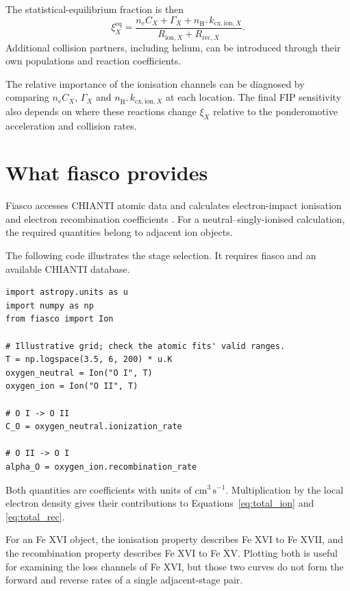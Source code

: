 \documentclass[a4paper,10pt,twoside,openany]{book}
\numberwithin{equation}{chapter}
\newenvironment{example}[1]{%
  \begin{tcolorbox}[bookbox,colback=BoxGray,colframe=RuleGray,
    colbacktitle=MidGray,coltitle=white,
    title={Example: #1}]}{\end{tcolorbox}}
\begin{document}
The statistical-equilibrium fraction is then
\begin{equation}
  \xi_X^{\mathrm{eq}}=
  \frac{n_eC_X+\Gamma_X+
        n_{\mathrm{H}^+}k_{\mathrm{cx,ion},X}}
       {R_{\mathrm{ion},X}+R_{\mathrm{rec},X}}.
  \label{eq:full_two_stage}
\end{equation}
Additional collision partners, including helium, can be introduced
through their own populations and reaction coefficients.

The relative importance of the ionisation channels can be
diagnosed by comparing $n_eC_X$, $\Gamma_X$ and
$n_{\mathrm{H}^+}k_{\mathrm{cx,ion},X}$ at each location.
The final FIP sensitivity also depends on where these reactions
change $\xi_X$ relative to the ponderomotive acceleration and
collision rates.

\section{What fiasco provides}
Fiasco accesses CHIANTI atomic data and calculates electron-impact
ionisation and electron recombination coefficients
\cite{FiascoDocs,Dufresne2024}. For a neutral--singly-ionised
calculation, the required quantities belong to adjacent ion objects.

\begin{example}{Selecting the oxygen coefficients}
The following code illustrates the stage selection. It requires
fiasco and an available CHIANTI database.
\begin{lstlisting}
import astropy.units as u
import numpy as np
from fiasco import Ion

# Illustrative grid; check the atomic fits' valid ranges.
T = np.logspace(3.5, 6, 200) * u.K
oxygen_neutral = Ion("O I", T)
oxygen_ion = Ion("O II", T)

# O I -> O II
C_O = oxygen_neutral.ionization_rate

# O II -> O I
alpha_O = oxygen_ion.recombination_rate
\end{lstlisting}
Both quantities are coefficients with units of
$\mathrm{cm^3\,s^{-1}}$. Multiplication by the local electron
density gives their contributions to
Equations~\eqref{eq:total_ion} and \eqref{eq:total_rec}.
\end{example}

For an Fe XVI object, the ionisation property describes
Fe XVI to Fe XVII, and the recombination property describes
Fe XVI to Fe XV. Plotting both is useful for examining the
loss channels of Fe XVI, but those two curves do not form
the forward and reverse rates of a single adjacent-stage pair.
\end{document}

